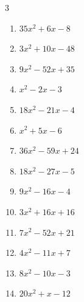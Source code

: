 \begin{multicols}{3}
\begin{enumerate}
        \phantom{$=(8x-1)(5x+7)$}

  \item $35x^{2}+6x-8$

        \phantom{$=(5x-2)(7x+4)$}

  \item $3x^{2}+10x-48$

        \phantom{$=(3x-8)(x+6)$}

  \item $9x^{2}-52x+35$

        \phantom{$=(x-5)(9x-7)$}

  \item $x^{2}-2x-3$

        \phantom{$=(x-3)(x+1)$}

  \item $18x^{2}-21x-4$

        \phantom{$=(6x+1)(3x-4)$}

  \item $x^{2}+5x-6$

        \phantom{$=(x+6)(x-1)$}

  \item $36x^{2}-59x+24$

        \phantom{$=(4x-3)(9x-8)$}

\columnbreak %

  \item $18x^{2}-27x-5$

        \phantom{$=(3x-5)(6x+1)$}

  \item $9x^{2}-16x-4$

        \phantom{$=(x-2)(9x+2)$}

  \item $3x^{2}+16x+16$

        \phantom{$=(x+4)(3x+4)$}

  \item $7x^{2}-52x+21$

        \phantom{$=(x-7)(7x-3)$}

  \item $4x^{2}-11x+7$

        \phantom{$=(4x-7)(x-1)$}

  \item $8x^{2}-10x-3$

        \phantom{$=(4x+1)(2x-3)$}

  \item $20x^{2}+x-12$

        \phantom{$=(5x+4)(4x-3)$}


\end{enumerate}
\end{multicols}
